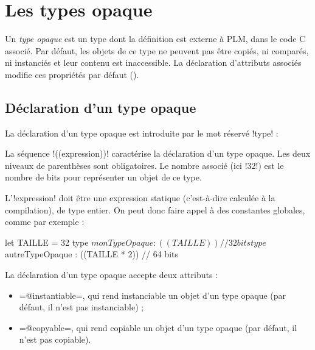 




\chapter{Les types opaque}

Un \emph{type opaque} est un type dont la définition est externe à PLM, dans le code C associé. Par défaut, les objets de ce type ne peuvent pas être copiés, ni comparés, ni instanciés et leur contenu est inaccessible. La déclaration d'attributs associés modifie ces propriétés par défaut ().

\section{Déclaration d'un type opaque}

La déclaration d'un type opaque est introduite par le mot réservé \plm!type! :


La séquence \plm!((expression))! caractérise la déclaration d'un type opaque. Les deux niveaux de parenthèses sont obligatoires. Le nombre associé (ici \plm!32!) est le nombre de bits pour représenter un objet de ce type.

L'\plm!expression! doit être une expression statique (c'est-à-dire calculée à la compilation), de type entier. On peut donc faire appel à des constantes globales, comme par exemple :

\begin{PLM}
let TAILLE = 32
type $monTypeOpaque : ((TAILLE)) // 32 bits
type $autreTypeOpaque : ((TAILLE * 2)) // 64 bits
\end{PLM}






La déclaration d'un type opaque accepte deux attributs :
\begin{itemize}
\item \plm=@instantiable=, qui rend instanciable un objet d'un type opaque (par défaut, il n'est pas instanciable) ;
\item \plm=@copyable=, qui rend copiable un objet d'un type opaque (par défaut, il n'est pas copiable).
\end{itemize}


